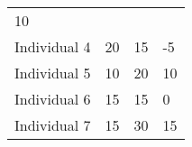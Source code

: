 \documentclass[]{article}
\begin{document}
\begin{longtable}[]{@{}llll@{}}
\begin{minipage}[t]{0.16\columnwidth}
10\strut
\end{minipage}\tabularnewline
\begin{minipage}[t]{0.20\columnwidth}\raggedright
Individual 4\strut
\end{minipage} & \begin{minipage}[t]{0.16\columnwidth}\raggedright
20\strut
\end{minipage} & \begin{minipage}[t]{0.16\columnwidth}\raggedright
15\strut
\end{minipage} & \begin{minipage}[t]{0.16\columnwidth}\raggedright
-5\strut
\end{minipage}\tabularnewline
\begin{minipage}[t]{0.20\columnwidth}\raggedright
Individual 5\strut
\end{minipage} & \begin{minipage}[t]{0.16\columnwidth}\raggedright
10\strut
\end{minipage} & \begin{minipage}[t]{0.16\columnwidth}\raggedright
20\strut
\end{minipage} & \begin{minipage}[t]{0.16\columnwidth}\raggedright
10\strut
\end{minipage}\tabularnewline
\begin{minipage}[t]{0.20\columnwidth}\raggedright
Individual 6\strut
\end{minipage} & \begin{minipage}[t]{0.16\columnwidth}\raggedright
15\strut
\end{minipage} & \begin{minipage}[t]{0.16\columnwidth}\raggedright
15\strut
\end{minipage} & \begin{minipage}[t]{0.16\columnwidth}\raggedright
0\strut
\end{minipage}\tabularnewline
\begin{minipage}[t]{0.20\columnwidth}\raggedright
Individual 7\strut
\end{minipage} & \begin{minipage}[t]{0.16\columnwidth}\raggedright
15\strut
\end{minipage} & \begin{minipage}[t]{0.16\columnwidth}\raggedright
30\strut
\end{minipage} & \begin{minipage}[t]{0.16\columnwidth}\raggedright
15\strut
\end{minipage}\tabularnewline

\end{longtable}
\end{document}
